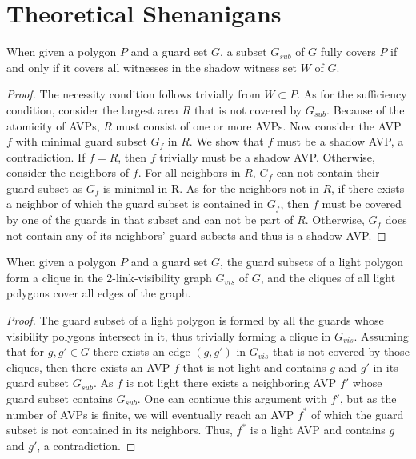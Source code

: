 \chapter{Theoretical Shenanigans}

\begin{theorem}\label{thm:shadow_coverage}
When given a polygon $P$ and a guard set $G$, a subset $G_{sub}$ of $G$ fully covers $P$ if and only if it covers all witnesses in the shadow witness set $W$ of $G$.
\end{theorem}
\begin{proof}
The necessity condition follows trivially from $W\subset P$. As for the sufficiency condition, consider the largest area $R$ that is not covered by $G_{sub}$. Because of the atomicity of AVPs, $R$ must consist of one or more AVPs. Now consider the AVP $f$ with minimal guard subset $G_{f}$ in $R$. We show that $f$ must be a shadow AVP, a contradiction. If $f = R$, then $f$ trivially must be a shadow AVP. Otherwise, consider the neighbors of $f$. For all neighbors in $R$, $G_{f}$ can not contain their guard subset as $G_{f}$ is minimal in R. As for the neighbors not in $R$, if there exists a neighbor of which the guard subset is contained in $G_{f}$, then $f$ must be covered by one of the guards in that subset and can not be part of $R$. Otherwise, $G_{f}$ does not contain any of its neighbors' guard subsets and thus is a shadow AVP.
\end{proof}

\begin{theorem}\label{thm:light_covers}
When given a polygon $P$ and a guard set $G$, the guard subsets of a light polygon form a clique in the 2-link-visibility graph $G_{vis}$ of $G$, and the cliques of all light polygons cover all edges of the graph.
\end{theorem}
\begin{proof}
The guard subset of a light polygon is formed by all the guards whose visibility polygons intersect in it, thus trivially forming a clique in $G_{vis}$. Assuming that for $g,g'\in G$ there exists an edge $(g, g')$ in $G_{vis}$ that is not covered by those cliques, then there exists an AVP $f$ that is not light and contains $g$ and $g'$ in its guard subset $G_{sub}$. As $f$ is not light there exists a neighboring AVP $f'$ whose guard subset contains $G_{sub}$. One can continue this argument with $f'$, but as the number of AVPs is finite, we will eventually reach an AVP $f^{*}$ of which the guard subset is not contained in its neighbors. Thus, $f^{*}$ is a light AVP and contains $g$ and $g'$, a contradiction.
\end{proof}

